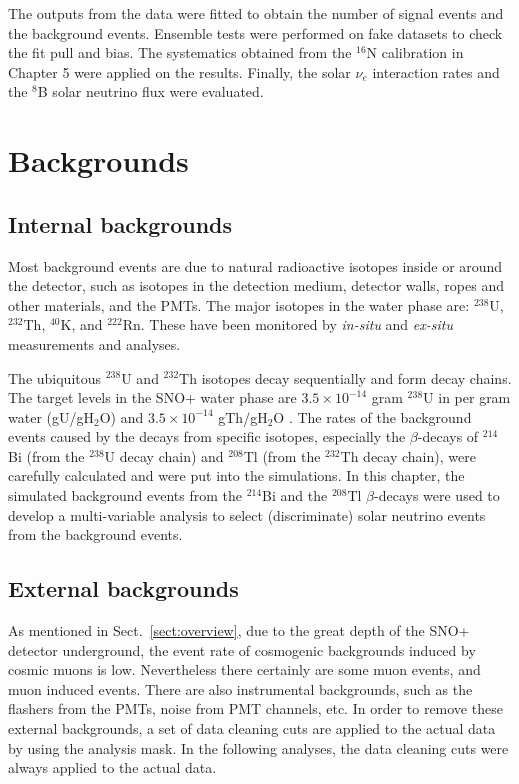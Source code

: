 The outputs from the data were fitted to obtain the number of signal events and the background events. Ensemble tests were performed on fake datasets to check the fit pull and bias. The systematics obtained from the $^{16}$N calibration in Chapter 5 were applied on the results. Finally, the solar $\nu_e$ interaction rates and the $^8$B solar neutrino flux were evaluated.

\section{Backgrounds}

\subsection{Internal backgrounds}

Most background events are due to natural radioactive isotopes inside or around the detector, such as isotopes in the detection medium, detector walls, ropes and other materials, and the PMTs. The major isotopes in the water phase are: $^{238}$U, $^{232}$Th, $^{40}$K, and $^{222}$Rn. These have been monitored by \emph{in-situ} and \emph{ex-situ} measurements and analyses. 

The ubiquitous $^{238}$U and $^{232}$Th isotopes decay sequentially and form decay chains. 
The target levels in the SNO+ water phase are $3.5\times 10^{-14}$ gram $^{238}$U in per gram water (gU/gH$_2$O) and $3.5\times 10^{-14}$ gTh/gH$_2$O \cite{waterunidoc}. The rates of the background events caused by the decays from specific isotopes, especially the $\beta$-decays of $^{214}$Bi (from the $^{238}$U decay chain) and $^{208}$Tl (from the $^{232}$Th decay chain), were carefully calculated and were put into the simulations. In this chapter, the simulated background events from the $^{214}$Bi and the $^{208}$Tl $\beta$-decays were used to develop a multi-variable analysis to select (discriminate) solar neutrino events from the background events.

\subsection{External backgrounds}

As mentioned in Sect.~\ref{sect:overview}, due to the great depth of the SNO+ detector underground, the event rate of cosmogenic backgrounds induced by cosmic muons is low. Nevertheless there certainly are some muon events, and muon induced events. There are also instrumental backgrounds, such as the flashers from the PMTs, noise from PMT channels, etc. In order to remove these external backgrounds, a set of data cleaning cuts are applied to the actual data by using the analysis mask. In the following analyses, the data cleaning cuts were always applied to the actual data.

